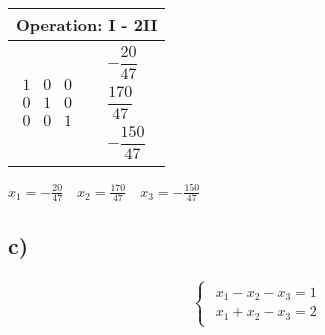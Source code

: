 \begin{longtable}{p{4cm}|p{3cm}}
    \multicolumn{2}{p{\dimexpr4cm+3cm+2\tabcolsep\relax}}{Operation: I - 2II} \\\hline\pagebreak[0]

    $\displaystyle\begin{matrix}
      1 & 0 & 0 \\ 0 & 1 & 0 \\ 0 & 0 & 1
    \end{matrix}$&
    $\displaystyle\begin{matrix}
      -\dfrac{20}{47} \\ \dfrac{170}{47} \\ -\dfrac{150}{47}
    \end{matrix}$\\\hline

\end{longtable}

$x_1 = -\frac{20}{47}\quad x_2 = \frac{170}{47}\quad x_3 = -\frac{150}{47}$

\subsection{c)}
\begin{align*}    
  \begin{cases}
    \begin{aligned}
      x_1 - x_2 - x_3 = 1 \\
      x_1 + x_2 - x_3 = 2
    \end{aligned}
  \end{cases}
\end{align*}

